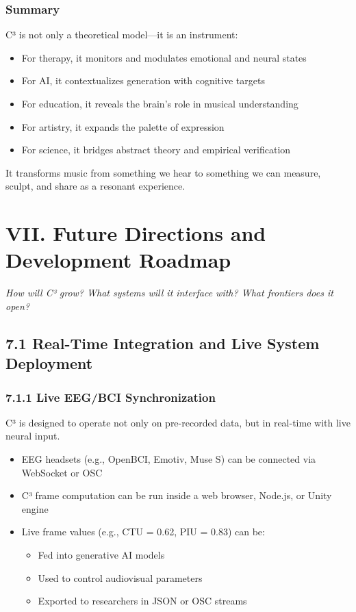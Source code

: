 \subsubsection*{Summary}

C³ is not only a theoretical model—it is an instrument:

\begin{itemize}
    \item For therapy, it monitors and modulates emotional and neural states
    \item For AI, it contextualizes generation with cognitive targets
    \item For education, it reveals the brain’s role in musical understanding
    \item For artistry, it expands the palette of expression
    \item For science, it bridges abstract theory and empirical verification
\end{itemize}

It transforms music from something we hear to something we can measure, sculpt, and share as a resonant experience.

\section*{VII. Future Directions and Development Roadmap}

\textit{How will C³ grow? What systems will it interface with? What frontiers does it open?}

\subsection*{7.1 Real-Time Integration and Live System Deployment}

\subsubsection*{7.1.1 Live EEG/BCI Synchronization}

C³ is designed to operate not only on pre-recorded data, but in real-time with live neural input.

\begin{itemize}
    \item EEG headsets (e.g., OpenBCI, Emotiv, Muse S) can be connected via WebSocket or OSC
    \item C³ frame computation can be run inside a web browser, Node.js, or Unity engine
    \item Live frame values (e.g., CTU = 0.62, PIU = 0.83) can be:
    \begin{itemize}
        \item Fed into generative AI models
        \item Used to control audiovisual parameters
        \item Exported to researchers in JSON or OSC streams
    \end{itemize}
\end{itemize}

